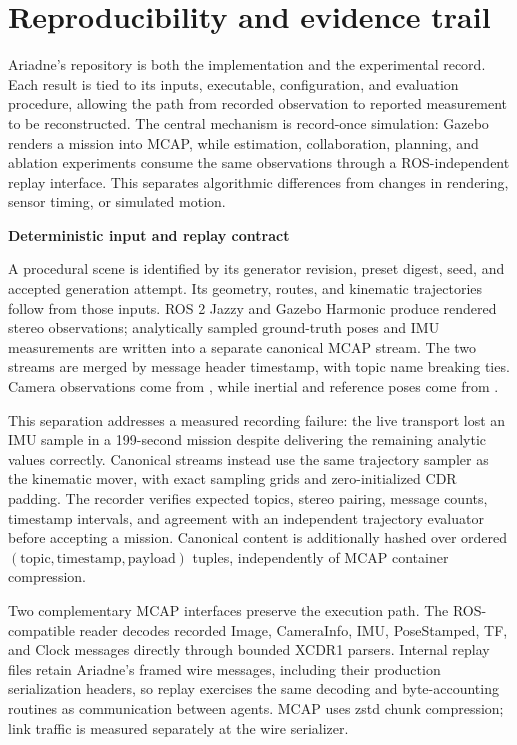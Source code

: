 \documentclass[10pt,a4paper]{article}
\newcommand{\code}[1]{\texttt{\small\detokenize{#1}}}
\newcommand{\indentedheading}[1]{\par\addvspace{0.65em}\noindent\hspace*{1em}\textbf{#1}\par\smallskip}
\begin{document}
\section{Reproducibility and evidence trail}

Ariadne's repository is both the implementation and the experimental
record. Each result is tied to its inputs, executable, configuration,
and evaluation procedure, allowing the path from recorded observation
to reported measurement to be reconstructed. The central mechanism is
record-once simulation: Gazebo renders a mission into MCAP, while
estimation, collaboration, planning, and ablation experiments consume
the same observations through a ROS-independent replay interface.
This separates algorithmic differences from changes in rendering,
sensor timing, or simulated motion.

\indentedheading{Deterministic input and replay contract}

A procedural scene is identified by its generator revision, preset
digest, seed, and accepted generation attempt. Its geometry, routes,
and kinematic trajectories follow from those inputs. ROS 2 Jazzy and
Gazebo Harmonic produce rendered stereo observations; analytically
sampled ground-truth poses and IMU measurements are written into a
separate canonical MCAP stream. The two streams are merged by message
header timestamp, with topic name breaking ties. Camera observations
come from \code{sensors/}, while inertial and reference poses come
from \code{canonical/}.

This separation addresses a measured recording failure: the live
transport lost an IMU sample in a 199-second mission despite
delivering the remaining analytic values correctly. Canonical
streams instead use the same trajectory sampler as the kinematic
mover, with exact sampling grids and zero-initialized CDR padding.
The recorder verifies expected topics, stereo pairing, message
counts, timestamp intervals, and agreement with an independent
trajectory evaluator before accepting a mission. Canonical content
is additionally hashed over ordered
$(\mathrm{topic},\mathrm{timestamp},\mathrm{payload})$ tuples,
independently of MCAP container compression.

Two complementary MCAP interfaces preserve the execution path.
The ROS-compatible reader decodes recorded Image, CameraInfo, IMU,
PoseStamped, TF, and Clock messages directly through bounded XCDR1
parsers. Internal replay files retain Ariadne's framed wire messages,
including their production serialization headers, so replay
exercises the same decoding and byte-accounting routines as
communication between agents. MCAP uses zstd chunk compression;
link traffic is measured separately at the wire serializer.
\end{document}
